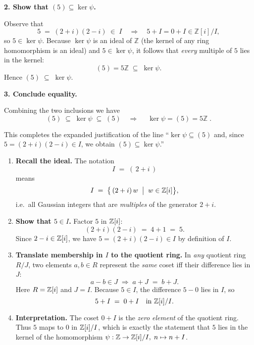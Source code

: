 \documentclass[12pt]{article}
\theoremstyle{definition} %
\theoremstyle{plain} %
\begin{document}
\bigskip
\textbf{2.  Show that \((5) \subseteq \ker\psi\).}

Observe that
\[
5 \;=\; (2+i)(2-i) \;\in\; I
\quad\Longrightarrow\quad
5+I=0+I\in\mathbb Z[i]/I,
\]
so \(5\in\ker\psi\).
Because \(\ker\psi\) is an ideal of \(\mathbb Z\) (the kernel of any ring
homomorphism is an ideal) and \(5\in\ker\psi\),
it follows that \emph{every} multiple of \(5\) lies in the kernel:
\[
(5)=5\mathbb Z \;\subseteq\; \ker\psi.
\]
Hence \(\boxed{(5)\;\subseteq\;\ker\psi}\).

\bigskip
\textbf{3.  Conclude equality.}

Combining the two inclusions we have
\[
(5)\;\subseteq\;\ker\psi\;\subseteq\;(5)
\quad\Longrightarrow\quad
\boxed{\;\ker\psi = (5)=5\mathbb Z\;}.
\]

This completes the expanded justification of the line  
“\(\ker\psi\subseteq(5)\) and, since \(5=(2+i)(2-i)\in I\), we obtain 
\((5)\subseteq\ker\psi\).”

\begin{enumerate}
  \item \textbf{Recall the ideal.}  
        The notation
        \[
             I \;=\; (\,2+i\,)
        \]
        means
        \[
             I \;=\;\bigl\{\, (2+i)\,w \;\bigm|\; w\in\Bbb Z[i] \bigr\},
        \]
        i.e.\ all Gaussian integers that are \emph{multiples} of the
        generator $2+i$.

  \item \textbf{Show that $5\in I$.}  
        Factor $5$ in $\Bbb Z[i]$:
        \[
             (2+i)(2-i) \;=\; 4+1 \;=\; 5.
        \]
        Since $2-i\in\Bbb Z[i]$, we have  
        $5=(2+i)(2-i)\in I$ by definition of $I$.

  \item \textbf{Translate membership in $I$ to the quotient ring.}  
        In \emph{any} quotient ring $R/J$, two elements
        $a,b\in R$ represent the \emph{same} coset iff their difference
        lies in $J$:
        \[
            a-b\in J \;\Longrightarrow\; a+J \;=\; b+J.
        \]
        Here $R=\Bbb Z[i]$ and $J=I$.
        Because $5\in I$, the difference $5-0$ lies in $I$, so
        \[
            5+I \;=\; 0+I \quad\text{in }\Bbb Z[i]/I.
        \]

  \item \textbf{Interpretation.}  
        The coset $0+I$ is the \emph{zero element} of the quotient
        ring.  Thus $5$ maps to $0$ in $\Bbb Z[i]/I$, which is exactly
        the statement that $5$ lies in the kernel of the homomorphism
        \(\psi:\Bbb Z\to\Bbb Z[i]/I,\; n\mapsto n+I\).
\end{enumerate}
\end{document}
